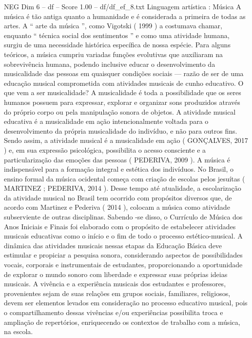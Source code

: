 \begin{textsample}{NEG Dim 6 – df – Score 1.00 – df/df\_ef\_8.txt}  \label{ex:f6_neg_165}
Linguagem artística : Música A música é tão antiga quanto a humanidade e é considerada a primeira de todas as artes.
A “ arte da música ”, como Vigotski ( 1999 ) a costumava chamar, enquanto “ técnica social dos sentimentos ” e como uma atividade humana, surgiu de uma necessidade histórica específica de nossa espécie.
Para alguns teóricos, a música cumpriu variadas funções evolutivas que auxiliaram na sobrevivência humana, podendo inclusive educar o desenvolvimento da musicalidade das pessoas em quaisquer condições sociais — razão de ser de uma educação musical comprometida com atividades musicais de cunho educativo.
O que vem a ser musicalidade?
A musicalidade é toda a possibilidade que os seres humanos possuem para expressar, explorar e organizar sons produzidos através do próprio corpo ou pela manipulação sonora de objetos.
A atividade musical educativa é a musicalidade em ação intencionalmente voltada para o desenvolvimento da própria musicalidade do indivíduo, e não para outros fins.
Sendo assim, a atividade musical é a musicalidade em ação ( GONÇALVES, 2017 ) e, em sua expressão psicológica, possibilita o acesso consciente e a particularização das emoções das pessoas ( PEDERIVA, 2009 ).
A música é indispensável para a formação integral e estética dos indivíduos.
No Brasil, o ensino formal da música ocidental começa com criação de escolas pelos jesuítas ( MARTINEZ ; PEDERIVA, 2014 ).
Desse tempo até atualidade, a escolarização da atividade musical no Brasil tem ocorrido com propósitos diversos que, de acordo com Martinez e Pederiva ( 2014 ), colocam a música como atividade subserviente de outras disciplinas.
Sabendo -se disso, o Currículo de Música dos Anos Iniciais e Finais foi elaborado com o propósito de estabelecer atividades musicais educativas como o início e o fim de todo o processo estético-musical.
A dinâmica das atividades musicais nessas etapas da Educação Básica deve estimular e propiciar a pesquisa sonora, considerando aspectos de possibilidades vocais, corporais e instrumentais de estudantes, proporcionando a oportunidade de explorar o mundo sonoro com liberdade e expressar suas próprias ideias musicais.
A vivência e a experiência musicais dos estudantes e professores, provenientes sejam de suas relações em grupos sociais, familiares, religiosos, devem ser elementos levados em consideração no processo educativo musical, pois o compartilhamento dessas vivências e/ou experiências possibilita troca e ampliação de repertórios, enriquecendo os contextos de trabalho com a música, na escola.

\end{textsample}
